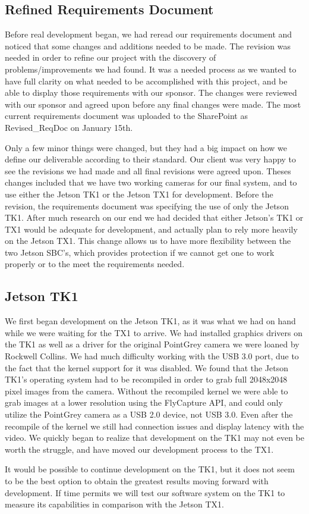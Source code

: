\documentclass[letterpaper,10pt,titlepage]{IEEEtran}
\begin{document}
   \subsection{Refined Requirements Document}
   Before real development began, we had reread our requirements document and noticed that some changes and additions needed to be made. The revision was needed in order to refine our project with the discovery of problems/improvements we had found. It was a needed process as we wanted to have full clarity on what needed to be accomplished with this project, and be able to display those requirements with our sponsor. The changes were reviewed with our sponsor and agreed upon before any final changes were made. The most current requirements document was uploaded to the SharePoint as Revised\_ReqDoc on January 15th.\\ 
\par
Only a few minor things were changed, but they had a big impact on how we define our deliverable according to their standard. Our client was very happy to see the revisions we had made and all final revisions were agreed upon. Theses changes included that we have two working cameras for our final system, and to use either the Jetson TK1 or the Jetson TX1 for development. Before the revision, the requirements document was specifying the use of only the Jetson TK1. After much research on our end we had decided that either Jetson's TK1 or TX1 would be adequate for development, and actually plan to rely more heavily on the Jetson TX1. This change allows us to have more flexibility between the two Jetson SBC's, which provides protection if we cannot get one to work properly or to the meet the requirements needed. 
   
   \subsection{Jetson TK1}
   We first began development on the Jetson TK1, as it was what we had on hand while we were waiting for the TX1 to arrive. We had installed graphics drivers on the TK1 as well as a driver for the original PointGrey camera we were loaned by Rockwell Collins. We had much difficulty working with the USB 3.0 port, due to the fact that the kernel support for it was disabled. We found that the Jetson TK1's operating system had to be recompiled in order to grab full 2048x2048 pixel images from the camera. Without the recompiled kernel we were able to grab images at a lower resolution using the FlyCapture API, and could only utilize the PointGrey camera as a USB 2.0 device, not USB 3.0. Even after the recompile of the kernel we still had connection issues and display latency with the video. We quickly began to realize that development on the TK1 may not even be worth the struggle, and have moved our development process to the TX1.\\ 
\par
It would be possible to continue development on the TK1, but it does not seem to be the best option to obtain the greatest results moving forward with development. If time permits we will test our software system on the TK1 to measure its capabilities in comparison with the Jetson TX1.
   
\end{document}
